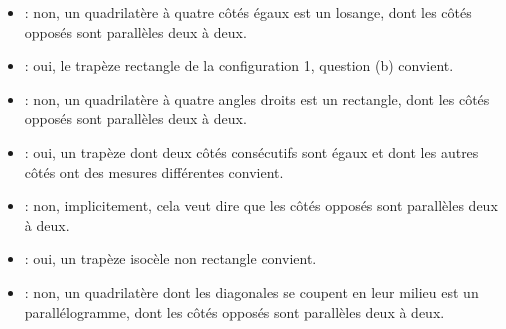 \begin{enumerate}
\begin{itemize}
            \item {} : non, un quadrilatère à quatre côtés égaux est un losange, dont les côtés opposés sont parallèles deux à deux. \medskip
            \item {} : oui, le trapèze rectangle de la configuration 1, question (b) convient. \medskip
            \item {} : non, un quadrilatère à quatre angles droits est un rectangle, dont les côtés opposés sont parallèles  deux à deux. \medskip
            \item {} : oui, un trapèze dont deux côtés consécutifs sont égaux et dont les autres côtés ont des mesures différentes convient. \medskip
            \item {} : non, implicitement, cela veut dire que les côtés opposés sont parallèles deux à deux. \medskip
            \item {} : oui, un trapèze isocèle non rectangle convient. \medskip
            \item {} : non, un quadrilatère dont les diagonales se coupent en leur milieu est un parallélogramme, dont les côtés opposés sont parallèles deux à deux.
         \end{itemize}
   \end{enumerate}
